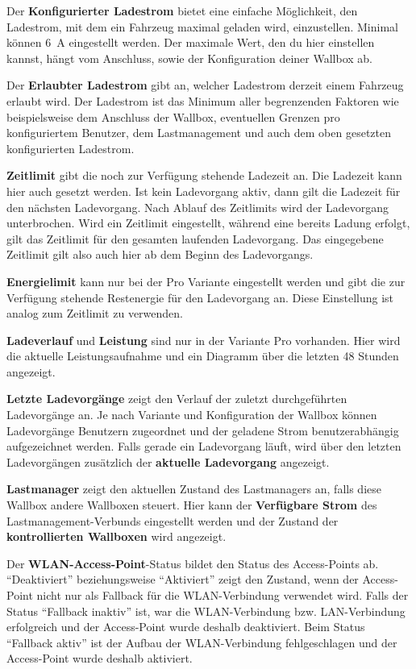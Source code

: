 \documentclass[a4paper,10pt]{article}
\begin{document}
\begin{multicols*}{2}
    Der \textbf{Konfigurierter Ladestrom} bietet eine einfache Möglichkeit, den
	Ladestrom, mit dem ein Fahrzeug maximal geladen wird, einzustellen.
	Minimal können \SI{6}{\ampere} eingestellt werden. Der maximale Wert, den du
	hier einstellen kannst, hängt vom Anschluss, sowie der Konfiguration deiner Wallbox ab.

    Der \textbf{Erlaubter Ladestrom} gibt an, welcher Ladestrom derzeit einem Fahrzeug erlaubt
    wird. Der Ladestrom ist das Minimum aller begrenzenden Faktoren wie
    beispielsweise dem Anschluss der Wallbox, eventuellen Grenzen pro konfiguriertem Benutzer,
    dem Lastmanagement und auch dem oben gesetzten konfigurierten Ladestrom.

    \textbf{Zeitlimit} gibt die noch zur Verfügung stehende Ladezeit an.
	Die Ladezeit kann hier auch gesetzt werden. Ist kein Ladevorgang
	aktiv, dann gilt die Ladezeit für den nächsten Ladevorgang. Nach Ablauf des
	Zeitlimits wird der Ladevorgang unterbrochen. Wird ein Zeitlimit
	eingestellt, während eine bereits Ladung erfolgt, gilt das Zeitlimit für den
	gesamten laufenden Ladevorgang. Das eingegebene Zeitlimit gilt also auch
	hier ab dem Beginn des Ladevorgangs.

    \textbf{Energielimit} kann nur bei der Pro Variante eingestellt werden und
	gibt die zur Verfügung stehende Restenergie für den
    Ladevorgang an. Diese Einstellung ist analog zum Zeitlimit zu verwenden.

    \textbf{Ladeverlauf} und \textbf{Leistung} sind nur in der Variante Pro
    vorhanden. Hier wird die aktuelle Leistungsaufnahme und ein Diagramm über
    die letzten 48 Stunden angezeigt.

    \textbf{Letzte Ladevorgänge} zeigt den Verlauf der zuletzt durchgeführten
	Ladevorgänge an. Je nach Variante und Konfiguration der Wallbox können Ladevorgänge Benutzern
	zugeordnet und der geladene Strom benutzerabhängig aufgezeichnet werden. Falls gerade ein Ladevorgang läuft,
	wird über den letzten Ladevorgängen zusätzlich der \textbf{aktuelle Ladevorgang} angezeigt.

    \textbf{Lastmanager} zeigt den aktuellen Zustand des Lastmanagers an, falls diese Wallbox
    andere Wallboxen steuert. Hier kann der \textbf{Verfügbare Strom} des Lastmanagement-Verbunds
    eingestellt werden und der Zustand der \textbf{kontrollierten Wallboxen} wird angezeigt.


    Der \textbf{WLAN-Access-Point}-Status bildet den Status des Access-Points ab.
    \enquote{Deaktiviert} beziehungsweise \enquote{Aktiviert} zeigt den Zustand, wenn der Access-Point nicht
    nur als Fallback für die WLAN-Verbindung verwendet wird. Falls der Status \enquote{Fallback inaktiv} ist,
    war die WLAN-Verbindung bzw. LAN-Verbindung erfolgreich und der Access-Point wurde deshalb deaktiviert.
    Beim Status \enquote{Fallback aktiv} ist der Aufbau der WLAN-Verbindung fehlgeschlagen und der
    Access-Point wurde deshalb aktiviert.


\end{multicols*}
\end{document}
